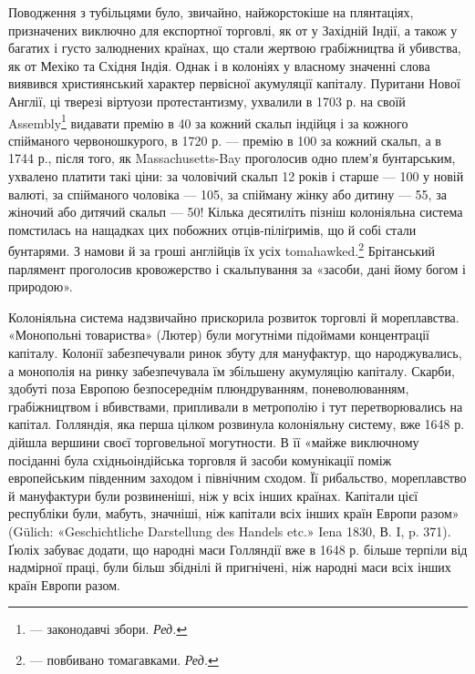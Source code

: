 Поводження з тубільцями було, звичайно, найжорстокіше
на плянтаціях, призначених виключно для експортної торговлі,
як от у Західній Індії, а також у багатих і густо залюднених
країнах, що стали жертвою грабіжництва й убивства, як от Мехіко
та Східня Індія. Однак і в колоніях у власному значенні
слова виявився християнський характер первісної акумуляції
капіталу. Пуритани Нової Англії, ці тверезі віртуози протестантизму,
ухвалили в 1703 р. на своїй Assembly\footnote*{
— законодавчі збори. \emph{Ред.}
} видавати премію
в 40 за кожний скальп індійця і за кожного
спійманого червоношкурого, в 1720 р. — премію в 100 за кожний скальп, а в 1744 р., після того, як Massachusetts-Bay
проголосив одно плем’я бунтарським, ухвалено платити
такі ціни: за чоловічий скальп 12 років і старше — 100 у
новій валюті, за спійманого чоловіка — 105, за спійману
жінку або дитину — 55, за
жіночий або дитячий скальп — 50!
Кілька десятиліть пізніш колоніяльна система помстилась на нащадках
цих побожних отців-піліґримів,
що й собі стали бунтарями. З намови й за гроші англійців їх усіх
tomahawked.\footnote*{
— повбивано томагавками. \emph{Ред.}
} Брітанський парлямент
проголосив кровожерство і скальпування
за «засоби, дані йому богом і природою».

Колоніяльна система надзвичайно прискорила розвиток торговлі й мореплавства. «Монопольні товариства»
(Лютер) були могутніми підоймами концентрації капіталу. Колонії забезпечували ринок збуту для
мануфактур, що народжувались, а монополія на ринку забезпечувала їм збільшену акумуляцію капіталу.
Скарби, здобуті поза Европою безпосереднім плюндруванням, поневолюванням, грабіжництвом і
вбивствами, припливали в метрополію і тут перетворювались на капітал. Голляндія, яка перша цілком
розвинула колоніяльну систему, вже 1648 р. дійшла вершини своєї торговельної могутности. В її «майже
виключному посіданні була східньоіндійська торговля й засоби
комунікації поміж европейським південним заходом і північним сходом. Її рибальство, мореплавство й
мануфактури були розвиненіші, ніж у всіх інших країнах. Капітали цієї республіки були, мабуть,
значніші, ніж капітали всіх інших країн Европи разом» (Gülich: «Geschichtliche Darstellung des
Handels etc.» Iena 1830, В. I, p. 371). Ґюліх забуває додати, що народні маси Голляндії вже в 1648
р. більше терпіли від надмірної праці, були більш збіднілі й пригнічені, ніж народні маси всіх інших
країн Европи разом.

